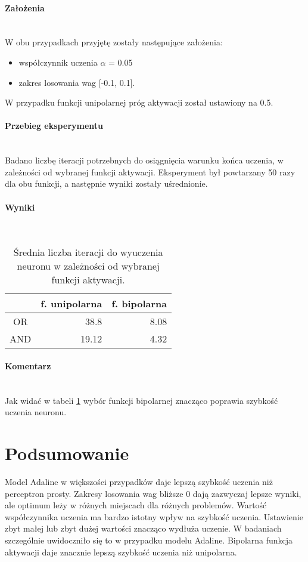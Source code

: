 \documentclass{article}
\begin{document}
	\paragraph{Założenia}\mbox{}\\
	W obu przypadkach przyjętę zostały następujące założenia:
	\begin{itemize}
		\item współczynnik uczenia $\alpha$ = 0.05
		\item zakres losowania wag [-0.1, 0.1].
	\end{itemize}
	W przypadku funkcji unipolarnej próg aktywacji został ustawiony na 0.5.
	\paragraph{Przebieg eksperymentu}\mbox{}\\
	Badano liczbę iteracji potrzebnych do osiągnięcia warunku końca uczenia, w zależności od wybranej funkcji aktywacji.
	Eksperyment był powtarzany 50 razy dla obu funkcji, a następnie wyniki zostały uśrednionie.
	\paragraph{Wyniki}\mbox{}\\
	\begin{table}[H]
		\centering
		\caption{Średnia liczba iteracji do wyuczenia neuronu w zależności od wybranej funkcji aktywacji.}
		\label{tab:activation}
		\begin{tabular}{|c|r|r|}
		\hline
			& \multicolumn{1}{c|}{f. unipolarna} & \multicolumn{1}{c|}{f. bipolarna} \\ \hline
		OR  & 38.8                               & 8.08                              \\ \hline
		AND & 19.12                              & 4.32                              \\ \hline
		\end{tabular}
		\end{table}
	\paragraph{Komentarz}\mbox{}\\
	Jak widać w tabeli \ref{tab:activation} wybór funkcji bipolarnej znacząco poprawia szybkość uczenia neuronu.
	\section{Podsumowanie}
	Model Adaline w większości przypadków daje lepszą szybkość uczenia niż perceptron prosty. 
	Zakresy losowania wag bliższe 0 dają zazwyczaj lepsze wyniki, ale optimum leży w różnych miejscach dla różnych problemów.
	Wartość współczynnika uczenia ma bardzo istotny wpływ na szybkość uczenia. 
	Ustawienie zbyt małej lub zbyt dużej wartości znacząco wydłuża uczenie. W badaniach szczególnie uwidoczniło się to w przypadku modelu Adaline.
	Bipolarna funkcja aktywacji daje znacznie lepszą szybkość uczenia niż unipolarna.
\end{document}
